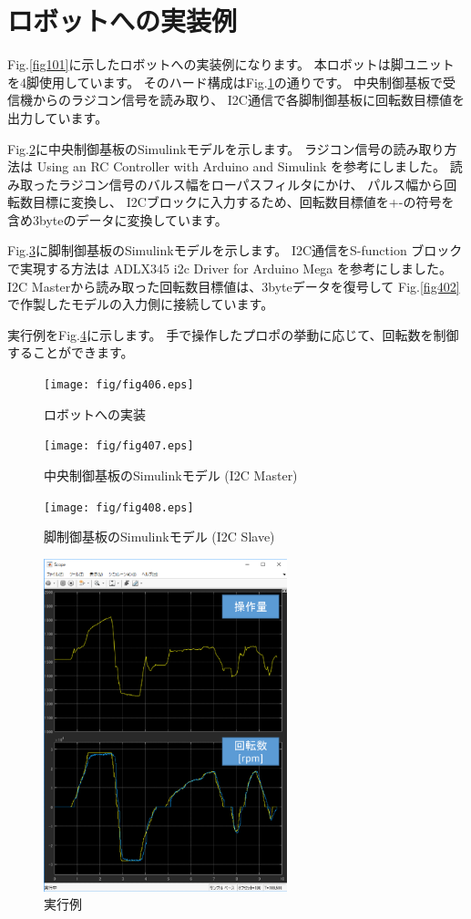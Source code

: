 \section{ロボットへの実装例}\label{ux7a4dux5c64ux65b9ux5411ux306eux5272ux308cux9632ux6b62ux69cbux6210}

Fig.\ref{fig101}に示したロボットへの実装例になります。
本ロボットは脚ユニットを4脚使用しています。
そのハード構成はFig.\ref{fig406}の通りです。
中央制御基板で受信機からのラジコン信号を読み取り、
I2C通信で各脚制御基板に回転数目標値を出力しています。

Fig.\ref{fig407}に中央制御基板のSimulinkモデルを示します。
ラジコン信号の読み取り方法は
Using an RC Controller with Arduino and Simulink\cite{MathWors_RC_receive}
を参考にしました。
読み取ったラジコン信号のバルス幅をローパスフィルタにかけ、
パルス幅から回転数目標に変換し、
I2Cブロックに入力するため、回転数目標値を+-の符号を含め3byteのデータに変換しています。

Fig.\ref{fig408}に脚制御基板のSimulinkモデルを示します。
I2C通信をS-function ブロックで実現する方法は
ADLX345 i2c Driver for Arduino Mega\cite{MathWors_I2C}
を参考にしました。
I2C Masterから読み取った回転数目標値は、3byteデータを復号して
Fig.\ref{fig402}で作製したモデルの入力側に接続しています。

実行例をFig.\ref{fig409}に示します。
手で操作したプロポの挙動に応じて、回転数を制御することができます。

\begin{figure}[htbp]
    \centering
    \texttt{[image: fig/fig406.eps]}
    \caption{ロボットへの実装}
    \label{fig406}
\end{figure}

\begin{figure}[htbp]
    \centering
    \texttt{[image: fig/fig407.eps]}
    \caption{中央制御基板のSimulinkモデル (I2C Master)}
    \label{fig407}
\end{figure}

\begin{figure}[htbp]
    \centering
    \texttt{[image: fig/fig408.eps]}
    \caption{脚制御基板のSimulinkモデル (I2C Slave)}
    \label{fig408}
\end{figure}

\begin{figure}[htbp]
    \centering
    \includegraphics[width=200pt]{fig/fig409.eps}
    \caption{実行例}
    \label{fig409}
\end{figure}

